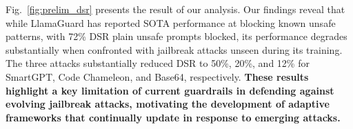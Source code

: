 Fig.~\ref{fig:prelim_dsr} presents the result of our analysis.
Our findings reveal that while LlamaGuard has reported SOTA performance at blocking known unsafe patterns, with 72\% DSR plain unsafe prompts blocked, its performance degrades substantially when confronted with jailbreak attacks unseen during its training.
The three attacks substantially reduced DSR to 50\%, 20\%, and 12\% for SmartGPT, Code Chameleon, and Base64, respectively.
\textbf{These results highlight a key limitation of current guardrails in defending against evolving jailbreak attacks, motivating the development of adaptive frameworks that continually update in response to emerging attacks.}



